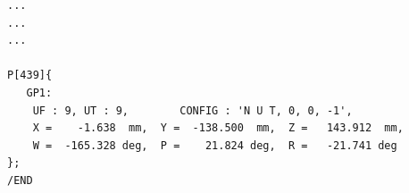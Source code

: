 \begin{code}
\begin{verbatim}
...
...
...

P[439]{
   GP1:
    UF : 9, UT : 9,        CONFIG : 'N U T, 0, 0, -1',
	X =    -1.638  mm,	Y =  -138.500  mm,	Z =   143.912  mm,
	W =  -165.328 deg,	P =    21.824 deg,	R =   -21.741 deg
};
/END

\end{verbatim}
\label{code:modified_post}
\end{code}





